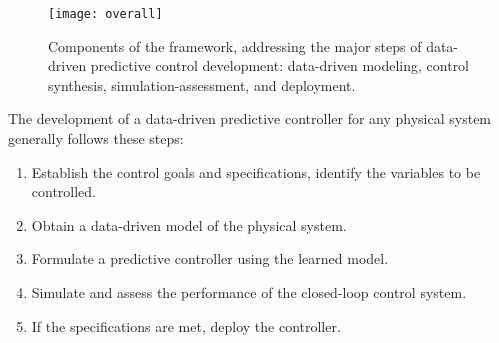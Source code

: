 \begin{figure}[!t]
  \centering
  \texttt{[image: overall]}
  \caption{Components of the framework, addressing the major steps of data-driven predictive control development: data-driven modeling, control synthesis, simulation-assessment, and deployment.}
  \label{fig:overall}
\end{figure}

The development of a data-driven predictive controller for any physical system generally follows these steps:
\begin{enumerate}
\item Establish the control goals and specifications, identify the variables to be controlled.
\item Obtain a data-driven model of the physical system. 
\item Formulate a predictive controller using the learned model.
\item Simulate and assess the performance of the closed-loop control system.
\item If the specifications are met, deploy the controller.
\end{enumerate}

